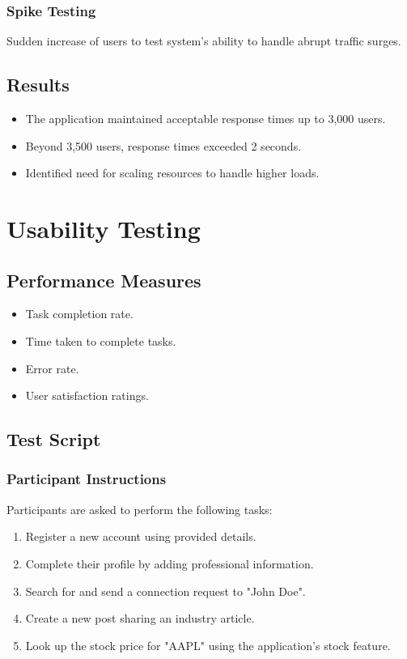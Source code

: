 \documentclass[12pt,a4paper]{report}
\begin{document}
\subsection{Spike Testing}
Sudden increase of users to test system's ability to handle abrupt traffic surges.

\section{Results}
\begin{itemize}
    \item The application maintained acceptable response times up to 3,000 users.
    \item Beyond 3,500 users, response times exceeded 2 seconds.
    \item Identified need for scaling resources to handle higher loads.
\end{itemize}

\chapter{Usability Testing}
\section{Performance Measures}
\begin{itemize}
    \item Task completion rate.
    \item Time taken to complete tasks.
    \item Error rate.
    \item User satisfaction ratings.
\end{itemize}

\section{Test Script}
\subsection{Participant Instructions}
Participants are asked to perform the following tasks:

\begin{enumerate}
    \item Register a new account using provided details.
    \item Complete their profile by adding professional information.
    \item Search for and send a connection request to "John Doe".
    \item Create a new post sharing an industry article.
    \item Look up the stock price for "AAPL" using the application's stock feature.
\end{enumerate}
\end{document}
